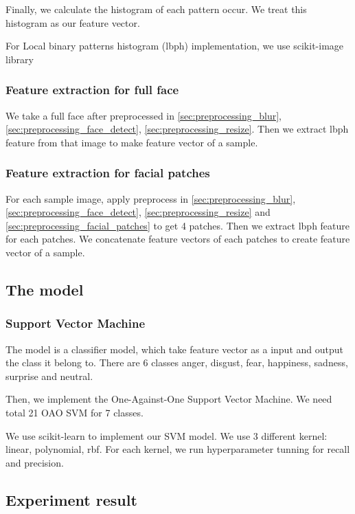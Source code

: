 \documentclass[a4paper, 12pt]{article}
\begin{document}
	Finally, we calculate the histogram of each pattern occur. We treat this histogram as our feature vector.
	
	For Local binary patterns histogram (lbph) implementation, we use scikit-image library \cite{van2014scikit}
	
	\subsubsection{Feature extraction for full face}
	\label{sec:extract_full}
	We take a full face after preprocessed in \ref{sec:preprocessing_blur}, \ref{sec:preprocessing_face_detect}, \ref{sec:preprocessing_resize}. Then we extract lbph feature from that image to make feature vector of a sample. 
	
	\subsubsection{Feature extraction for facial patches}
	\label{sec:extract_patches}
	For each sample image, apply preprocess in \ref{sec:preprocessing_blur}, \ref{sec:preprocessing_face_detect}, \ref{sec:preprocessing_resize} and \ref{sec:preprocessing_facial_patches} to get 4 patches. Then we extract lbph feature for each patches. We concatenate feature vectors of each patches to create feature vector of a sample.
	
		
\subsection{The model}
\subsubsection{Support Vector Machine}
\label{sec:model_svm}
	The model is a classifier model, which take feature vector as a input and output the class it belong to. There are 6 classes anger, disgust, fear, happiness, sadness, surprise and neutral.
	
	Then, we implement the One-Against-One Support Vector Machine. We need total 21 OAO SVM for 7 classes.
	
	We use scikit-learn to \cite{pedregosa2011scikit} implement our SVM model. We use 3 different kernel: linear, polynomial, rbf. For each kernel, we run hyperparameter tunning for recall and precision.

\subsection{Experiment result}
\end{document}
